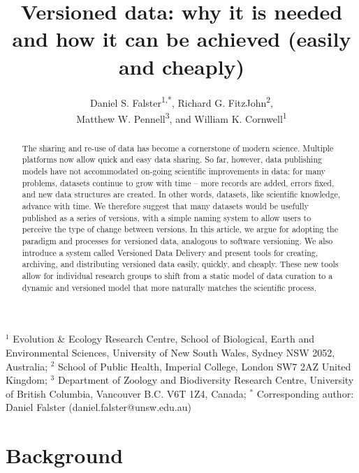 \documentclass[english]{article}
\begin{document}
\title{Versioned data: why it is needed and how it can be achieved (easily and cheaply)}

\author{Daniel S. Falster\textsuperscript{1,*}, Richard G. FitzJohn\textsuperscript{2},\\ Matthew
  W. Pennell\textsuperscript{3}, and William K. Cornwell\textsuperscript{1}}

\maketitle
\thispagestyle{fancy}
$^1$ Evolution \& Ecology Research Centre, School of Biological, Earth and Environmental Sciences,
University of New South Wales, Sydney NSW 2052, Australia; 
$^2$ School of Public Health, Imperial College, London SW7 2AZ United Kingdom; 
$^3$ Department of Zoology and Biodiversity Research Centre, University of British Columbia, Vancouver B.C. V6T 1Z4, Canada;
$^*$ Corresponding author: Daniel Falster (daniel.falster@unsw.edu.au)

\begin{abstract}
The sharing and re-use of data has become a cornerstone of modern science. Multiple platforms now allow quick and easy data sharing. So far, however, data publishing models have not accommodated on-going scientific improvements in data: for many problems, datasets continue to grow with time -- more records are added, errors fixed, and new data structures are created. In other words, datasets, like scientific knowledge, advance with time. We therefore suggest that many datasets would be usefully published as a series of versions, with a simple naming system to allow users to perceive the type of change between versions. In this article, we argue for adopting the paradigm and processes for versioned data, analogous to software versioning. We also introduce a system called Versioned Data Delivery and present tools for creating, archiving, and distributing versioned data easily, quickly, and cheaply. These new tools allow for individual research groups to shift from a static model of data curation to a dynamic and versioned model that more naturally matches the scientific process.
\end{abstract}


\section*{Background}
\end{document}
